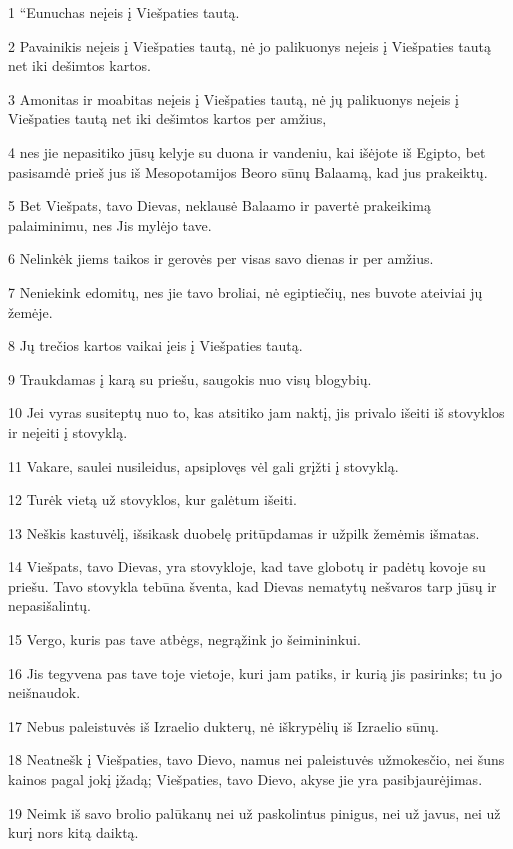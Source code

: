 \par 1 “Eunuchas neįeis į Viešpaties tautą. 
\par 2 Pavainikis neįeis į Viešpaties tautą, nė jo palikuonys neįeis į Viešpaties tautą net iki dešimtos kartos. 
\par 3 Amonitas ir moabitas neįeis į Viešpaties tautą, nė jų palikuonys neįeis į Viešpaties tautą net iki dešimtos kartos per amžius, 
\par 4 nes jie nepasitiko jūsų kelyje su duona ir vandeniu, kai išėjote iš Egipto, bet pasisamdė prieš jus iš Mesopotamijos Beoro sūnų Balaamą, kad jus prakeiktų. 
\par 5 Bet Viešpats, tavo Dievas, neklausė Balaamo ir pavertė prakeikimą palaiminimu, nes Jis mylėjo tave. 
\par 6 Nelinkėk jiems taikos ir gerovės per visas savo dienas ir per amžius. 
\par 7 Neniekink edomitų, nes jie tavo broliai, nė egiptiečių, nes buvote ateiviai jų žemėje. 
\par 8 Jų trečios kartos vaikai įeis į Viešpaties tautą. 
\par 9 Traukdamas į karą su priešu, saugokis nuo visų blogybių. 
\par 10 Jei vyras susiteptų nuo to, kas atsitiko jam naktį, jis privalo išeiti iš stovyklos ir neįeiti į stovyklą. 
\par 11 Vakare, saulei nusileidus, apsiplovęs vėl gali grįžti į stovyklą. 
\par 12 Turėk vietą už stovyklos, kur galėtum išeiti. 
\par 13 Neškis kastuvėlį, išsikask duobelę pritūpdamas ir užpilk žemėmis išmatas. 
\par 14 Viešpats, tavo Dievas, yra stovykloje, kad tave globotų ir padėtų kovoje su priešu. Tavo stovykla tebūna šventa, kad Dievas nematytų nešvaros tarp jūsų ir nepasišalintų. 
\par 15 Vergo, kuris pas tave atbėgs, negrąžink jo šeimininkui. 
\par 16 Jis tegyvena pas tave toje vietoje, kuri jam patiks, ir kurią jis pasirinks; tu jo neišnaudok. 
\par 17 Nebus paleistuvės iš Izraelio dukterų, nė iškrypėlių iš Izraelio sūnų. 
\par 18 Neatnešk į Viešpaties, tavo Dievo, namus nei paleistuvės užmokesčio, nei šuns kainos pagal jokį įžadą; Viešpaties, tavo Dievo, akyse jie yra pasibjaurėjimas. 
\par 19 Neimk iš savo brolio palūkanų nei už paskolintus pinigus, nei už javus, nei už kurį nors kitą daiktą. 
